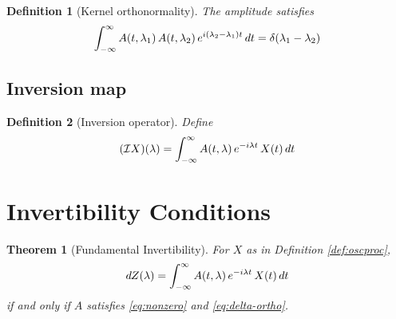 \documentclass{article}
\newtheorem{definition}{Definition}
\newtheorem{theorem}{Theorem}
\begin{document}
\begin{definition}
  [Kernel orthonormality]\label{def:orthonormality} The amplitude satisfies
  \begin{equation}
    \label{eq:delta-ortho} \int_{- \infty}^{\infty} A (t, \lambda_1) 
    \hspace{0.17em} A (t, \lambda_2)  \hspace{0.17em} e^{i (\lambda_2 -
    \lambda_1) t}  \hspace{0.17em} dt = \delta (\lambda_1 - \lambda_2)
  \end{equation}
\end{definition}

\subsection{Inversion map}

\begin{definition}
  [Inversion operator]\label{def:invop} Define
  \begin{equation}
    \label{eq:invop} (\mathcal{I}X) (\lambda) = \int_{- \infty}^{\infty} A (t,
    \lambda)  \hspace{0.17em} e^{- i \lambda t}  \hspace{0.17em} X (t) 
    \hspace{0.17em} dt
  \end{equation}
\end{definition}

\section{Invertibility Conditions}

\begin{theorem}
  [Fundamental Invertibility]\label{thm:fund-inv} For $X$ as in Definition
  \ref{def:oscproc},
  \begin{equation}
    \label{eq:inv-identity} dZ (\lambda) = \int_{- \infty}^{\infty} A (t,
    \lambda)  \hspace{0.17em} e^{- i \lambda t}  \hspace{0.17em} X (t) 
    \hspace{0.17em} dt
  \end{equation}
  if and only if $A$ satisfies \eqref{eq:nonzero} and \eqref{eq:delta-ortho}.
\end{theorem}
\end{document}
